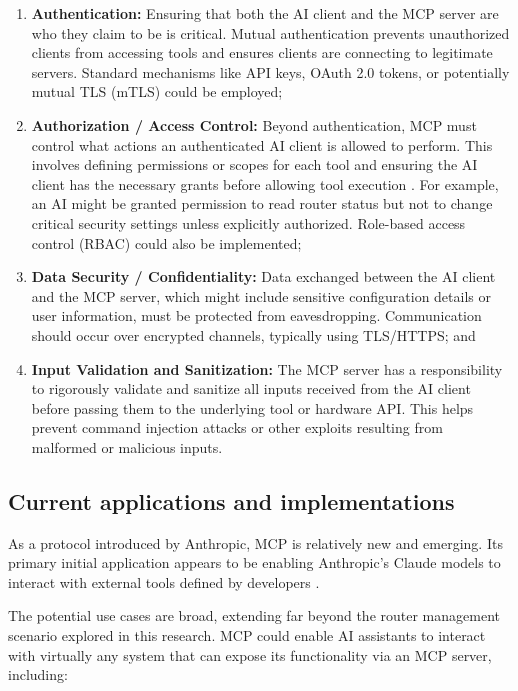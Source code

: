 \begin{enumerate}
\item \textbf{Authentication:} Ensuring that both the AI client and the MCP server are who they claim to be is critical. Mutual authentication prevents unauthorized clients from accessing tools and ensures clients are connecting to legitimate servers. Standard mechanisms like API keys, OAuth 2.0 tokens, or potentially mutual TLS (mTLS) could be employed;

\item \textbf{Authorization / Access Control:} Beyond authentication, MCP must control what actions an authenticated AI client is allowed to perform. This involves defining permissions or scopes for each tool and ensuring the AI client has the necessary grants before allowing tool execution \cite{mcp_docs}. For example, an AI might be granted permission to read router status but not to change critical security settings unless explicitly authorized. Role-based access control (RBAC) could also be implemented;

\item \textbf{Data Security / Confidentiality:} Data exchanged between the AI client and the MCP server, which might include sensitive configuration details or user information, must be protected from eavesdropping. Communication should occur over encrypted channels, typically using TLS/HTTPS; and

\item \textbf{Input Validation and Sanitization:} The MCP server has a responsibility to rigorously validate and sanitize all inputs received from the AI client before passing them to the underlying tool or hardware API. This helps prevent command injection attacks or other exploits resulting from malformed or malicious inputs.
\end{enumerate}

\subsection{Current applications and implementations}
As a protocol introduced by Anthropic, MCP is relatively new and emerging. Its primary initial application appears to be enabling Anthropic's Claude models to interact with external tools defined by developers \cite{mcp_intro}.

The potential use cases are broad, extending far beyond the router management scenario explored in this research. MCP could enable AI assistants to interact with virtually any system that can expose its functionality via an MCP server, including:

